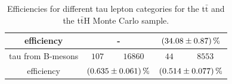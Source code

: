 \begin{table}
\begin{tabular*}{\linewidth}{@{\extracolsep{\fill}}ccccc}
		efficiency                  & \multicolumn{2}{c}{-}   & \multicolumn{2}{c}{$\SI{34.08\pm 0.87}{\percent}$}
		\\
		\hline
		tau from B-mesons           & $107$            & $16860$      & $44$            & $8553$ 
		\\
		efficiency                  & \multicolumn{2}{c}{$\SI{0.635\pm 0.061}{\percent}$}   & \multicolumn{2}{c}{$\SI{0.514\pm 0.077}{\percent}$}
		\\
		\hline
		\hline
		\end{tabular*}
		\caption[Efficiencies for the t$\bar{\text{t}}$ and the t$\bar{\text{t}}$H sample.]{Efficiencies for different tau lepton categories for the t$\bar{\text{t}}$ and the t$\bar{\text{t}}$H Monte Carlo sample.}
		\label{ttbarttHEffTable}
          \renewcommand{\arraystretch}{1}
\end{table}
%
%	
